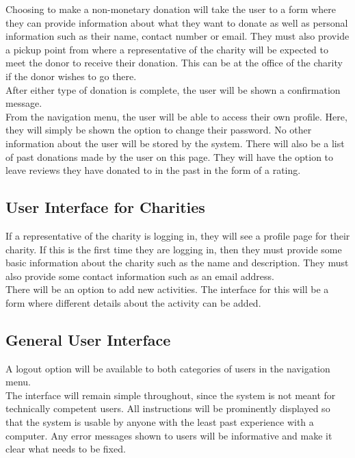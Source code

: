\documentclass{scrreprt}
\begin{document}
Choosing to make a non-monetary donation will take the user to a form where they can provide information about what they want to donate as well as personal information such as their name, contact number or email. They must also provide a pickup point from where a representative of the charity will be expected to meet the donor to receive their donation. This can be at the office of the charity if the donor wishes to go there.\\

After either type of donation is complete, the user will be shown a confirmation message.\\

From the navigation menu, the user will be able to access their own profile. Here, they will simply be shown the option to change their password. No other information about the user will be stored by the system. There will also be a list of past donations made by the user on this page. They will have the option to leave reviews they have donated to in the past in the form of a rating.\\

\subsection*{User Interface for Charities}

If a representative of the charity is logging in, they will see a profile page for their charity. If this is the first time they are logging in, then they must provide some basic information about the charity such as the name and description. They must also provide some contact information such as an email address.\\

There will be an option to add new activities. The interface for this will be a form where different details about the activity can be added.\\

\subsection*{General User Interface}

A logout option will be available to both categories of users in the navigation menu.\\

The interface will remain simple throughout, since the system is not meant for technically competent users. All instructions will be prominently displayed so that the system is usable by anyone with the least past experience with a computer. Any error messages shown to users will be informative and make it clear what needs to be fixed.\\
\end{document}
